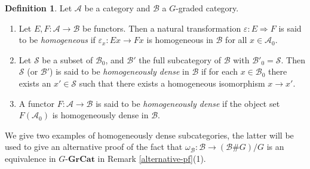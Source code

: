 \documentclass{surv-l}
\numberwithin{equation}{chapter}
\numberwithin{figure}{chapter}
\theoremstyle{plain}
\theoremstyle{definition}
\newtheorem{dfn}[thm]{Definition}
\theoremstyle{remark}
\newcommand{\GGrCat}{G\text{-}\mathbf{GrCat}}
\begin{document}
\pagebreak

\begin{dfn}
Let $\mathcal{A}$ be a category and $\mathcal{B}$ a $G$-graded category.
\begin{enumerate}
\item
Let $E, F \colon \mathcal{A} \to \mathcal{B}$ be functors.
Then a natural transformation $\varepsilon \colon E \Rightarrow F$
is said to be \emph{homogeneous} if
$\varepsilon_x \colon Ex \to Fx$ is homogeneous in $\mathcal{B}$
for all $x \in \mathcal{A}_0$.
\item
Let $\mathcal{S}$ be a subset of $\mathcal{B}_0$,
and $\mathcal{B}'$ the full subcategory of $\mathcal{B}$ with $\mathcal{B}'_0 = \mathcal{S}$.
Then $\mathcal{S}$ (or $\mathcal{B}'$) is said to be \emph{homogeneously dense}
in $\mathcal{B}$ if
for each $x \in \mathcal{B}_0$ there exists an $x' \in \mathcal{S}$ such that
there exists a homogeneous isomorphism $x \to x'$.
\item
A functor $F \colon \mathcal{A} \to \mathcal{B}$
is said to be \emph{homogeneously dense}
if the object set $F(\mathcal{A}_0)$ is homogeneously dense in $\mathcal{B}$.
\end{enumerate}
\end{dfn}

We give two examples of homogeneously dense subcategories,
the latter will be used to give an alternative proof of the fact that
$\omega_{\mathcal{B}} \colon \mathcal{B} \to (\mathcal{B} \# G)/G$ is an
equivalence in $\GGrCat$ in Remark \ref{alternative-pf}(1).
\end{document}
